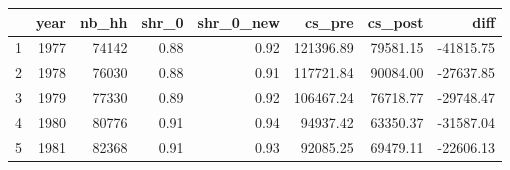 \begin{table}[ht]
\centering
\begin{tabular}{rrrrrrrr}
  \hline
 & year & nb\_hh & shr\_0 & shr\_0\_new & cs\_pre & cs\_post & diff \\ 
  \hline
1 & 1977 & 74142 & 0.88 & 0.92 & 121396.89 & 79581.15 & -41815.75 \\ 
  2 & 1978 & 76030 & 0.88 & 0.91 & 117721.84 & 90084.00 & -27637.85 \\ 
  3 & 1979 & 77330 & 0.89 & 0.92 & 106467.24 & 76718.77 & -29748.47 \\ 
  4 & 1980 & 80776 & 0.91 & 0.94 & 94937.42 & 63350.37 & -31587.04 \\ 
  5 & 1981 & 82368 & 0.91 & 0.93 & 92085.25 & 69479.11 & -22606.13 \\ 
   \hline
\end{tabular}
\label{tab:post_merger_cs}
\end{table}
